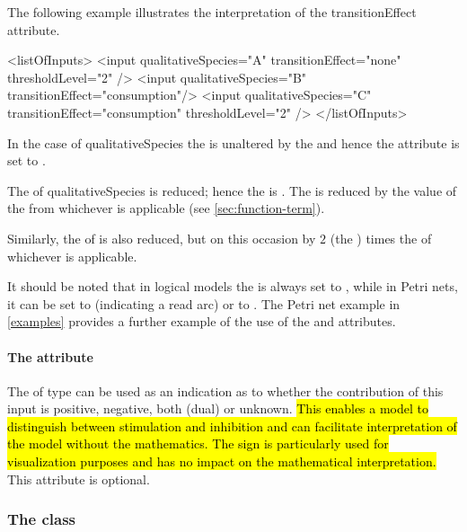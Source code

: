 The following example illustrates the interpretation of the transitionEffect attribute. 

\begin{example}
<listOfInputs>
    <input qualitativeSpecies="A"   transitionEffect="none"        thresholdLevel="2" />
    <input qualitativeSpecies="B"   transitionEffect="consumption"/>
    <input qualitativeSpecies="C"   transitionEffect="consumption" thresholdLevel="2" />
</listOfInputs>
\end{example}

In the case of qualitativeSpecies  the  is unaltered by the \Transition and hence the  attribute is set to . 

The  of qualitativeSpecies  is reduced; hence the  is . The  is reduced by the value of the  from whichever \FunctionTerm is applicable  (see \ref{sec:function-term}). 

Similarly, the  of  is also reduced, but on this occasion by $2$ (the ) times the  of whichever \FunctionTerm is applicable. 

It should be noted that in logical models the  is always set to , while in Petri nets, it can be set to  (indicating a read arc) or to .  The Petri net example in \ref{examples} provides a further example of the use of the  and  attributes. 


 
\paragraph{The  attribute}
The  of type  can be used as an indication as to whether the contribution of this input is positive, negative, both (dual) or unknown. \hl{This enables a model to distinguish between stimulation and inhibition and can facilitate interpretation of the model without the mathematics. The sign is particularly used for visualization purposes and has no impact on the mathematical interpretation.} This attribute is optional.


\subsubsection{The  class}
\label{output-class}

